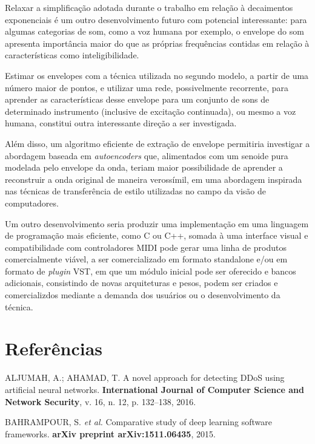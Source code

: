 \documentclass[]{article}
\begin{document}
Relaxar a simplificação adotada durante o trabalho em relação à
decaimentos exponenciais é um outro desenvolvimento futuro com potencial
interessante: para algumas categorias de som, como a voz humana por
exemplo, o envelope do som apresenta importância maior do que as
próprias frequências contidas em relação à características como
inteligibilidade.

Estimar os envelopes com a técnica utilizada no segundo modelo, a partir
de uma número maior de pontos, e utilizar uma rede, possivelmente
recorrente, para aprender as características desse envelope para um
conjunto de sons de determinado instrumento (inclusive de excitação
continuada), ou mesmo a voz humana, constitui outra interessante direção
a ser investigada.

Além disso, um algoritmo eficiente de extração de envelope permitiria
investigar a abordagem baseada em \emph{autoencoders} que, alimentados
com um senoide pura modelada pelo envelope da onda, teriam maior
possibilidade de aprender a reconstruir a onda original de maneira
verossímil, em uma abordagem inspirada nas técnicas de transferência de
estilo utilizadas no campo da visão de computadores.

Um outro desenvolvimento seria produzir uma implementação em uma
linguagem de programação mais eficiente, como C ou C++, somada à uma
interface visual e compatibilidade com controladores MIDI pode gerar uma
linha de produtos comercialmente viável, a ser comercializado em formato
standalone e/ou em formato de \emph{plugin} VST, em que um módulo
inicial pode ser oferecido e bancos adicionais, consistindo de novas
arquiteturas e pesos, podem ser criados e comercializdos mediante a
demanda dos usuários ou o desenvolvimento da técnica.

\hypertarget{referuxeancias}{%
\section*{Referências}\label{referuxeancias}}

\hypertarget{refs}{}
\leavevmode\hypertarget{ref-aljumah2016novel}{}%
ALJUMAH, A.; AHAMAD, T. A novel approach for detecting DDoS using
artificial neural networks. \textbf{International Journal of Computer
Science and Network Security}, v. 16, n. 12, p. 132--138, 2016.

\leavevmode\hypertarget{ref-bahrampour2015comparative}{}%
BAHRAMPOUR, S. \emph{et al.} Comparative study of deep learning software
frameworks. \textbf{arXiv preprint arXiv:1511.06435}, 2015.
\end{document}
